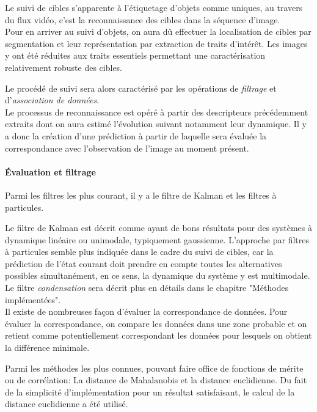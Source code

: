 \documentclass[a4paper,11pt]{report}
\begin{document}
Le suivi de cibles s'apparente à l'étiquetage d'objets comme uniques, au travers du flux vidéo, c'est la reconnaissance des cibles dans la séquence d'image. \\

Pour en arriver au suivi d'objets, on aura dû effectuer la localisation de cibles par segmentation et leur représentation par extraction de traits d'intérêt.
Les images y ont été réduites aux traits essentiels permettant une caractérisation relativement robuste des cibles. 

Le procédé de suivi sera alors caractérisé par les opérations de \emph{filtrage} et d'\emph{association de données}.  \\

Le processus de reconnaissance est opéré à partir des descripteurs précédemment extraits dont on aura estimé l'évolution suivant notamment leur dynamique. Il y a donc la création d'une prédiction à partir de laquelle sera évaluée la correspondance avec l'observation de l'image au moment présent. 

\paragraph{Évaluation et filtrage}
Parmi les filtres les plus courant, il y a le filtre de Kalman et les filtres à particules.

Le filtre de Kalman est décrit comme ayant de bons résultats pour des systèmes à dynamique linéaire ou unimodale, typiquement gaussienne. L'approche par filtres à particules semble plus indiquée dans le cadre du suivi de cibles, car la prédiction de l'état courant doit prendre en compte toutes les alternatives possibles simultanément, en ce sens, la dynamique du système y est multimodale.
Le filtre \textit{condensation} sera décrit plus en détails dans le chapitre "Méthodes implémentées". \\  

Il existe de nombreuses façon d'évaluer la correspondance de données. 
Pour évaluer la correspondance, on compare les données dans une zone probable et on retient comme potentiellement correspondant les données pour lesquels on obtient la différence minimale.
 
Parmi les méthodes les plus connues, pouvant faire office de fonctions de mérite ou de corrélation: 
La distance de Mahalanobis et la distance euclidienne. 
Du fait de la simplicité d'implémentation pour un résultat satisfaisant, le calcul de la distance euclidienne a été utilisé.
\end{document}
